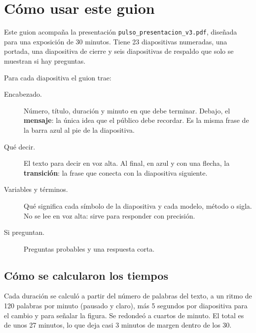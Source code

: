 \section{Cómo usar este guion}

Este guion acompaña la presentación \texttt{pulso\_presentacion\_v3.pdf}, diseñada para
una exposición de 30 minutos. Tiene 23 diapositivas numeradas, una portada, una
diapositiva de cierre y seis diapositivas de respaldo que solo se muestran si hay
preguntas.

Para cada diapositiva el guion trae:

\begin{description}
\item[Encabezado.] Número, título, duración y minuto en que debe terminar. Debajo, el
\textbf{mensaje}: la única idea que el público debe recordar. Es la misma frase de la
barra azul al pie de la diapositiva.
\item[Qué decir.] El texto para decir en voz alta. Al final, en azul y con una flecha,
la \textbf{transición}: la frase que conecta con la diapositiva siguiente.
\item[Variables y términos.] Qué significa cada símbolo de la diapositiva y cada modelo,
método o sigla. No se lee en voz alta: sirve para responder con precisión.
\item[Si preguntan.] Preguntas probables y una respuesta corta.
\end{description}

\subsection{Cómo se calcularon los tiempos}
Cada duración se calculó a partir del número de palabras del texto, a un ritmo de 120
palabras por minuto (pausado y claro), más 5 segundos por diapositiva para el cambio y
para señalar la figura. Se redondeó a cuartos de minuto. El total es de unos 27 minutos,
lo que deja casi 3 minutos de margen dentro de los 30.


